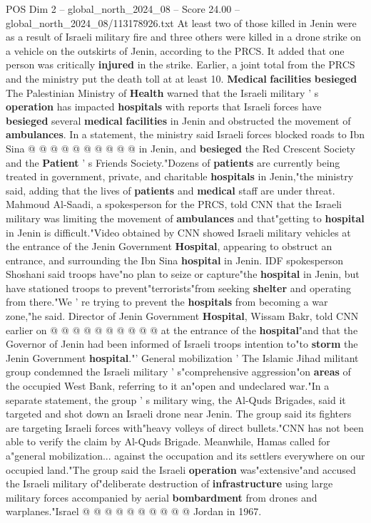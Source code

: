 \begin{textsample}{POS Dim 2 – global\_north\_2024\_08 – Score 24.00 – global\_north\_2024\_08/113178926.txt}
At least two of those killed in Jenin were as a result of Israeli military fire and three others were killed in a drone strike on a vehicle on the outskirts of Jenin, according to the PRCS.
It added that one person was critically \textbf{injured} in the strike.
Earlier, a joint total from the PRCS and the ministry put the death toll at at least 10. \textbf{Medical} \textbf{facilities} \textbf{besieged} The Palestinian Ministry of \textbf{Health} warned that the Israeli military ' s \textbf{operation} has impacted \textbf{hospitals} with reports that Israeli forces have \textbf{besieged} several \textbf{medical} \textbf{facilities} in Jenin and obstructed the movement of \textbf{ambulances}.
In a statement, the ministry said Israeli forces blocked roads to Ibn Sina @ @ @ @ @ @ @ @ @ @ in Jenin, and \textbf{besieged} the Red Crescent Society and the \textbf{Patient} ' s Friends Society."Dozens of \textbf{patients} are currently being treated in government, private, and charitable \textbf{hospitals} in Jenin,"the ministry said, adding that the lives of \textbf{patients} and \textbf{medical} staff are under threat.
Mahmoud Al-Saadi, a spokesperson for the PRCS, told CNN that the Israeli military was limiting the movement of \textbf{ambulances} and that"getting to \textbf{hospital} in Jenin is difficult."Video obtained by CNN showed Israeli military vehicles at the entrance of the Jenin Government \textbf{Hospital}, appearing to obstruct an entrance, and surrounding the Ibn Sina \textbf{hospital} in Jenin.
IDF spokesperson Shoshani said troops have"no plan to seize or capture"the \textbf{hospital} in Jenin, but have stationed troops to prevent"terrorists"from seeking \textbf{shelter} and operating from there."We ' re trying to prevent the \textbf{hospitals} from becoming a war zone,"he said.
Director of Jenin Government \textbf{Hospital}, Wissam Bakr, told CNN earlier on @ @ @ @ @ @ @ @ @ @ at the entrance of the \textbf{hospital}"and that the Governor of Jenin had been informed of Israeli troops intention to"to \textbf{storm} the Jenin Government \textbf{hospital}."' General mobilization ' The Islamic Jihad militant group condemned the Israeli military ' s"comprehensive aggression"on \textbf{areas} of the occupied West Bank, referring to it an"open and undeclared war."In a separate statement, the group ' s military wing, the Al-Quds Brigades, said it targeted and shot down an Israeli drone near Jenin.
The group said its fighters are targeting Israeli forces with"heavy volleys of direct bullets."CNN has not been able to verify the claim by Al-Quds Brigade.
Meanwhile, Hamas called for a"general mobilization... against the occupation and its settlers everywhere on our occupied land."The group said the Israeli \textbf{operation} was"extensive"and accused the Israeli military of"deliberate destruction of \textbf{infrastructure} using large military forces accompanied by aerial \textbf{bombardment} from drones and warplanes."Israel @ @ @ @ @ @ @ @ @ @ Jordan in 1967.

\end{textsample}
